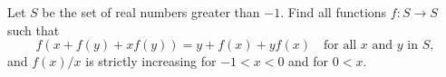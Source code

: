 Let $S$ be the set of real numbers greater than $-1$. Find all functions $f : S \to S$ such that
\[
f(x + f(y) + xf(y)) = y + f(x) + yf(x) \quad \text{for all } x \text{ and } y \text{ in } S,
\]
and $f(x)/x$ is strictly increasing for $-1 < x < 0$ and for $0 < x$.
